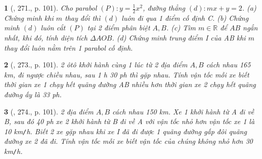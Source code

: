 \documentclass{article}
\newtheorem{baitoan}{}
\begin{document}
\begin{baitoan}[\cite{Tuyen_Toan_9_old}, 271., p. 101]
	Cho parabol $(P):y = \frac{1}{2}x^2$, đường thẳng $(d):mx + y = 2$. (a) Chứng minh khi $m$ thay đổi thì $(d)$ luôn đi qua 1 điểm cố định C. (b) Chứng minh $(d)$ luôn cắt $(P)$ tại 2 điểm phân biệt $A,B$. (c) Tìm $m\in\mathbb{R}$ để $AB$ ngắn nhất, khi đó, tính diện tích $\Delta AOB$. (d) Chứng minh trung điểm I của AB khi $m$ thay đổi luôn nằm trên 1 parabol cố định.
\end{baitoan}

\begin{baitoan}[\cite{Tuyen_Toan_9_old}, 273., p. 101]
	2 ôtô khởi hành cùng 1 lúc từ 2 địa điểm $A,B$ cách nhau {\rm165 km}, đi ngược chiều nhau, sau {\rm1 h 30 ph} thì gặp nhau. Tính vận tốc mỗi xe biết thời gian xe 1 chạy hết quãng đường AB nhiều hơn thời gian xe 2 chạy hết quãng đường ấy là {\rm33 ph}.
\end{baitoan}

\begin{baitoan}[\cite{Tuyen_Toan_9_old}, 274., p. 101]
	2 địa điểm $A,B$ cách nhau {\rm150 km}. Xe 1 khởi hành từ A đi về B, sau đó {\rm40 ph} xe 2 khởi hành từ B đi về A với vận tốc nhỏ hơn vận tốc xe 1 là {\rm10 km{\tt/}h}. Biết 2 xe gặp nhau khi xe I đã đi được 1 quãng đường gấp đôi quãng đường xe 2 đã đi. Tính vận tốc mỗi xe biết vận tốc của chúng không nhỏ hơn {\rm30 km{\tt/}h}.
\end{baitoan}


\printbibliography[heading=bibintoc]
	
\end{document}
